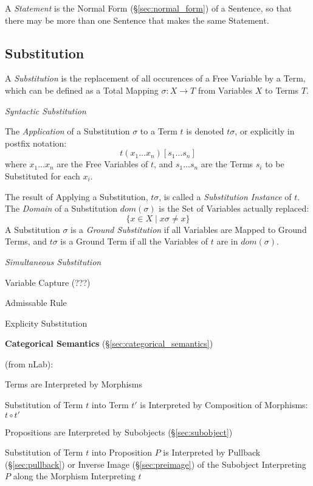 A \emph{Statement} is the Normal Form (\S\ref{sec:normal_form}) of a
Sentence, so that there may be more than one Sentence that makes the
same Statement.



\subsection{Substitution}\label{sec:substitution}

A \emph{Substitution} is the replacement of all occurences of a Free
Variable by a Term, which can be defined as a Total Mapping $\sigma: X
\rightarrow T$ from Variables $X$ to Terms $T$.

\emph{Syntactic Substitution}

The \emph{Application} of a Substitution $\sigma$ to a Term $t$ is
denoted $t\sigma$, or explicitly in postfix notation:
\[
  t(x_1 \ldots x_n)[s_1 \ldots s_n]
\]
where $x_1 \ldots x_n$ are the Free Variables of $t$, and $s_1 \ldots
s_n$ are the Terms $s_i$ to be Substituted for each $x_i$.

The result of Applying a Substitution, $t\sigma$, is called a
\emph{Substitution Instance} of $t$. The \emph{Domain} of a
Substitution $dom(\sigma)$ is the Set of Variables actually replaced:
\[
  \{ x \in X \;|\; x\sigma \neq x \}
\]
A Substitution $\sigma$ is a \emph{Ground Substitution} if all
Variables are Mapped to Ground Terms, and $t\sigma$ is a Ground Term
if all the Variables of $t$ are in $dom(\sigma)$.

\emph{Simultaneous Substitution}

Variable Capture (???)

Admissable Rule

Explicity Substitution


\textbf{Categorical Semantics} (\S\ref{sec:categorical_semantics})

(from nLab): %

Terms are Interpreted by Morphisms

Substitution of Term $t$ into Term $t'$ is Interpreted by Composition
of Morphisms: $t \circ t'$

Propositions are Interpreted by Subobjects (\S\ref{sec:subobject})

Substitution of Term $t$ into Proposition $P$ is Interpreted by
Pullback (\S\ref{sec:pullback}) or Inverse Image
(\S\ref{sec:preimage}) of the Subobject Interpreting $P$ along the
Morphism Interpreting $t$

